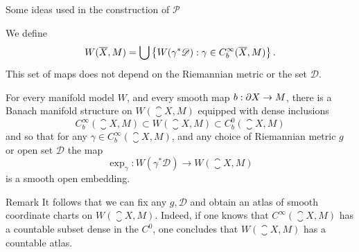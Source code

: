 \documentclass{amsart}
\begin{document}
\begin{clear}{Some ideas used in the construction of $\mathscr{P}$}
\begin{defn}
  We define
  \begin{equation*}
    W(\overline{X},M)=\bigcup \left\{W(\gamma^{*}\mathscr{D}):\gamma\in C^{\infty}_{b}(\overline{X},M)\right\}.
  \end{equation*}
  This set of maps does not depend on the Riemannian metric or the set $\mathscr{D}$.
\end{defn}
\begin{thm}
  For every manifold model $W$, and every smooth map $b:\partial X\to M$, there is a Banach manifold structure on $W(\closure{X},M)$ equipped with dense inclusions
  \begin{equation*}
    C^{\infty}_{b}(\closure{X},M)\subset W(\closure{X},M)\subset C^{0}_{b}(\closure{X},M)
  \end{equation*}
  and so that for any $\gamma\in C^{\infty}_{b}(\closure{X},M)$, and any choice of Riemannian metric $g$ or open set $\mathscr{D}$ the map
  \begin{equation*}
    \exp_{\gamma}:W(\gamma^{*}\mathscr{D})\to W(\closure{X},M)
  \end{equation*}
  is a smooth open embedding. 
\end{thm}
\begin{clear}{Remark}
  It follows that we can fix any $g,\mathscr{D}$ and obtain an atlas of smooth coordinate charts on $W(\closure{X},M)$. Indeed, if one knows that $C^{\infty}(\closure{X},M)$ has a countable subset dense in the $C^{0}$, one concludes that $W(\closure{X},M)$ has a countable atlas. 
\end{clear}

\end{clear}
\end{document}
